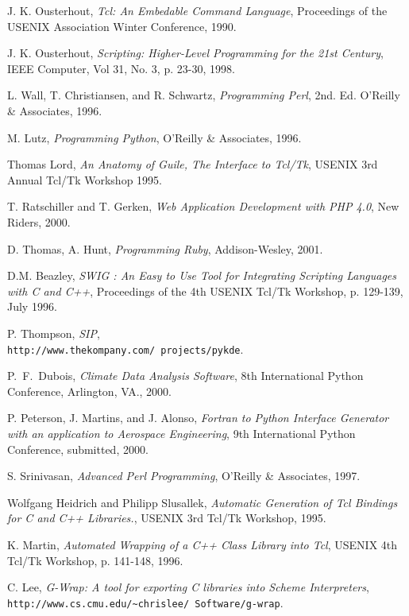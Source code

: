 \begin{thebibliography}{99}


 J. K. Ousterhout, {\em Tcl: An Embedable Command Language},
Proceedings of the USENIX Association Winter Conference, 1990.

 J. K. Ousterhout, {\em Scripting: Higher-Level Programming for the 21st Century},
IEEE Computer, Vol 31, No. 3, p. 23-30, 1998.

 L. Wall, T. Christiansen, and R. Schwartz, {\em Programming Perl}, 2nd. Ed.
O'Reilly \& Associates, 1996.

 M. Lutz, {\em Programming Python}, O'Reilly \& Associates, 1996.

 Thomas Lord, {\em An Anatomy of Guile, The Interface to 
Tcl/Tk}, USENIX 3rd Annual Tcl/Tk Workshop 1995.

 T. Ratschiller and T. Gerken, {\em Web Application Development with PHP 4.0},
New Riders, 2000.

 D. Thomas, A. Hunt, {\em Programming Ruby}, Addison-Wesley, 2001.

 D.M. Beazley, {\em SWIG : An Easy to Use Tool for Integrating Scripting Languages with C and C++}, Proceedings of the 4th USENIX Tcl/Tk Workshop, p. 129-139, July 1996. 

 P. Thompson, {\em SIP},\\
{\tt http://www.thekompany.com/ projects/pykde}.

 P.~F.~Dubois, {\em Climate Data Analysis Software}, 8th International Python Conference,
Arlington, VA., 2000.

 P. Peterson, J. Martins, and J. Alonso,
{\em Fortran to Python Interface Generator with an application to Aerospace
Engineering}, 9th International Python Conference, submitted, 2000.

 S. Srinivasan, {\em Advanced Perl Programming}, O'Reilly \& Associates, 1997.

 Wolfgang Heidrich and Philipp Slusallek, {\em Automatic Generation of Tcl Bindings for C and C++ Libraries.},
USENIX 3rd Tcl/Tk Workshop, 1995.

 K. Martin, {\em Automated Wrapping of a C++ Class Library into Tcl},
USENIX 4th Tcl/Tk Workshop, p. 141-148, 1996. 

 C. Lee, {\em G-Wrap: A tool for exporting C libraries into Scheme Interpreters},\\
{\tt http://www.cs.cmu.edu/\~{ }chrislee/
Software/g-wrap}.


\end{thebibliography}
